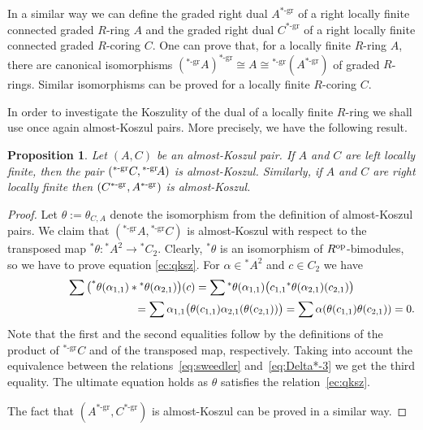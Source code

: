 \documentclass[pdftex]{sigma}
\renewcommand{\^}[1]{\mbox{$^{\left( #1 \right)}$}}
\renewcommand{\_}[1]{\mbox{$_{\left( #1 \right)}$}}
\newcommand{\al}{\alpha}
\numberwithin{equation}{section}
\newtheorem{Proposition}[Theorem]{Proposition}
{ \theoremstyle{definition}
\newtheorem{Definition}[Theorem]{Definition}
\newtheorem{Remark}[Theorem]{Remark}
}
\begin{document}
In a similar way we can def\/ine the graded right dual $A^{{*\text{-gr}}}$ of a right locally f\/inite connected graded $R$-ring $A$ and the graded right dual $C^{*\text{-gr}}$ of a right locally f\/inite connected graded $R$-coring $C$. One can prove that, for a locally f\/inite $R$-ring $A$, there are canonical isomorphisms
$(^{*\text{-gr}}\!A )^{*\text{-gr}}\cong A\cong {}^{*\text{-gr}}(A^{*\text{-gr}}) $ of graded $R$-rings. Similar isomorphisms can be proved for a locally f\/inite $R$-coring $C$.

In order to investigate the Koszulity of the dual of a locally f\/inite $R$-ring we shall use once again almost-Koszul pairs. More precisely, we have the following result.

\begin{Proposition} \label{prop:a-ksz-dual}
Let $(A,C)$ be an almost-Koszul pair. If $A$ and $C$ are left locally finite, then the pair $({^{*\text{\rm -gr}}}C, {^{*\text{\rm -gr}}}\!A)$ is almost-Koszul. Similarly, if $A$ and $C$ are right locally finite then $(C^{*\text{\rm -gr}},A^{*\text{\rm -gr}})$ is almost-Koszul.
\end{Proposition}

\begin{proof}
Let $\theta:=\theta_{C,A}$ denote the isomorphism from the def\/inition of almost-Koszul pairs. We claim that $(^{*\text{-gr}}\! A,{}^{*\text{-gr}}C)$ is almost-Koszul with respect to the transposed map $^*\theta\colon {}^\ast\! A^2\to{}^\ast C_2$. Clearly, $^*\theta$ is an isomorphism of $R^{\rm op}$-bimodules, so we have to prove equation \eqref{ec:qksz}. For $\al\in{}^*\!A^2$ and $c\in C_2$ we have
\begin{gather*}
 \sum {}\big(^*\theta(\al_{1,1})*{}^*\theta(\al_{2,1})\big)(c) = \sum {}^*\theta(\al_{1,1})\big(c_{1,1}{}^*\theta(\al_{2,1})(c_{2,1})\big)\\
 \hphantom{\sum {}\big(^*\theta(\al_{1,1})*{}^*\theta(\al_{2,1})\big)(c)}{} =\sum {}\al_{1,1}\big(\theta(c_{1,1})\al_{2,1}(\theta(c_{2,1}))\big)
 =\sum {}\al(\theta(c_{1,1})\theta(c_{2,1}))=0.
\end{gather*}
Note that the f\/irst and the second equalities follow by the def\/initions of the product of $^{*\text{-gr}}C$ and of the transposed map, respectively. Taking into account the equivalence between the rela\-tions~\eqref{eq:sweedler} and~\eqref{eq:Delta*-3} we get the third equality. The ultimate equation holds as $\theta$ satisf\/ies the rela\-tion~\eqref{ec:qksz}.

The fact that $(A^{*\text{-gr}},C^{*\text{-gr}})$ is almost-Koszul can be proved in a similar way.
\end{proof}
\end{document}
